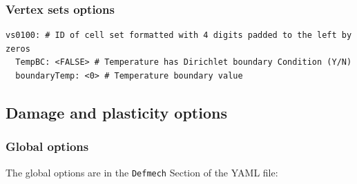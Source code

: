 \documentclass[10pt,oneside]{report}
\begin{document}
\subsubsection{Vertex sets options}
\begin{verbatim}
vs0100: # ID of cell set formatted with 4 digits padded to the left by zeros
  TempBC: <FALSE> # Temperature has Dirichlet boundary Condition (Y/N) 
  boundaryTemp: <0> # Temperature boundary value 
\end{verbatim}

\subsection{Damage and plasticity options}

\subsubsection{Global options}
The global options are in the \verb+Defmech+ Section of the YAML file:
\end{document}
